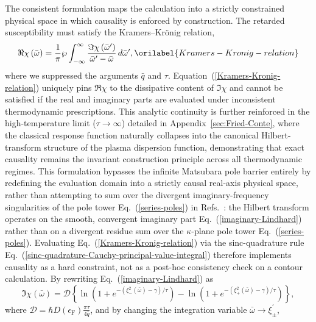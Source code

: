 \documentclass[aps,showkeys,noshowpacs,superscriptaddress,pre,preprint]{revtex4-2}
\let\label\orilabel
\begin{document}
The consistent formulation maps the calculation into a strictly constrained physical space
in which causality is enforced by construction.
The retarded susceptibility must satisfy the Kramers--Kr\"onig relation,
\begin{equation}
\Re \chi\left( \bar{\omega} \right) = 
\frac{1}{\pi} \wp \int_{-\infty}^{\infty} 
\frac{\Im \chi\left( \bar{\omega}^\prime \right)}{\bar{\omega}^\prime - \bar{\omega}} \, d\bar{\omega}^\prime ,
\label{Kramers-Kronig-relation}
\end{equation}
where we suppressed the arguments $\bar{q}$ and $\tau$.
Equation~(\ref{Kramers-Kronig-relation}) uniquely pins $\Re\chi$ to the dissipative content of $\Im\chi$
and cannot be satisfied if the real and imaginary parts are evaluated under inconsistent thermodynamic prescriptions.
This analytic continuity is further reinforced in the high-temperature limit ($\tau \to \infty$) detailed in Appendix~\ref{sec:Fried-Conte}, where the classical response function naturally collapses into the canonical Hilbert-transform structure of the plasma dispersion function, demonstrating that exact causality remains the invariant construction principle across all thermodynamic regimes.
This formulation bypasses the infinite Matsubara pole barrier entirely by redefining the evaluation domain into a strictly causal real-axis physical space, rather than attempting to sum over the divergent imaginary-frequency singularities of the pole tower Eq.~(\ref{series-poles}) in Refs.~\cite{Khanna-Glyde1976,Gouedard-Deutsch1978}:
the Hilbert transform operates on the smooth, convergent imaginary part Eq.~(\ref{imaginary-Lindhard})
rather than on a divergent residue sum over the $\kappa$-plane pole tower Eq.~(\ref{series-poles}).
Evaluating Eq.~(\ref{Kramers-Kronig-relation}) via the sinc-quadrature rule
Eq.~(\ref{sinc-quadrature-Cauchy-principal-value-integral})
therefore implements causality as a hard constraint, not as a post-hoc consistency check on a contour calculation.
By rewriting Eq.~(\ref{imaginary-Lindhard}) as
\begin{equation*}
\Im \chi\left( \bar{\omega} \right) = \mathcal{D} \left\{ \ln\left( 1 + e^{- \left( \xi_-^2 \left( \bar{\omega} \right) - \gamma \right) / \tau} \right) 
- \ln\left( 1 + e^{- \left( \xi_+^2 \left( \bar{\omega} \right) - \gamma \right) / \tau} \right) \right\} ,
\end{equation*}
where $\mathcal{D} = \hbar D\left( \epsilon_\mathrm{F} \right) \frac{\pi \tau}{4 \bar{q}}$,
and by changing the integration variable $\bar{\omega} \rightarrow \xi_\pm^\prime$,
\end{document}
